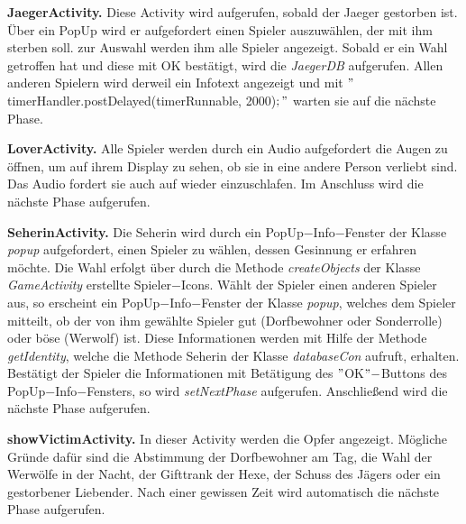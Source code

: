 \documentclass[12pt, a4paper]{article}
\begin{document}
\vspace{0,3 cm}      
      
\textbf{JaegerActivity.}
Diese Activity wird aufgerufen, sobald der Jaeger gestorben ist. Über ein PopUp wird er aufgefordert einen Spieler auszuwählen, der mit ihm sterben soll. zur Auswahl werden ihm alle Spieler angezeigt. Sobald er ein Wahl getroffen hat und diese mit OK bestätigt, wird die \textit{JaegerDB} aufgerufen.
Allen anderen Spielern wird derweil ein Infotext angezeigt und mit $"$timerHandler.postDelayed(timerRunnable, 2000)$;"$ warten sie auf die nächste Phase.
    
\vspace{0,3 cm}    
      
\textbf{LoverActivity.}
Alle Spieler werden durch ein Audio aufgefordert die Augen zu öffnen, um auf ihrem Display zu sehen, ob sie in eine andere Person verliebt sind. Das Audio fordert sie auch auf wieder einzuschlafen. Im Anschluss wird die nächste Phase aufgerufen.

\vspace{0,3 cm}

\textbf{SeherinActivity.}
Die Seherin wird durch ein PopUp$-$Info$-$Fenster der Klasse \textit{popup} aufgefordert, einen Spieler zu wählen, dessen Gesinnung er erfahren möchte. Die Wahl erfolgt über durch die Methode \textit{createObjects} der Klasse \textit{GameActivity} erstellte Spieler$-$Icons. Wählt der Spieler einen anderen Spieler aus, so erscheint ein PopUp$-$Info$-$Fenster der Klasse \textit{popup}, welches dem Spieler mitteilt, ob der von ihm gewählte Spieler gut (Dorfbewohner oder Sonderrolle) oder böse (Werwolf) ist. Diese Informationen werden mit Hilfe der Methode \textit{getIdentity}, welche die Methode Seherin der Klasse \textit{databaseCon} aufruft, erhalten. Bestätigt der Spieler die Informationen mit Betätigung des $"$OK$"-$Buttons des  PopUp$-$Info$-$Fensters, so wird \textit{setNextPhase} aufgerufen. Anschließend wird die nächste Phase aufgerufen.

\vspace{0,3 cm}      
   
\textbf{showVictimActivity.}
In dieser Activity werden die Opfer angezeigt.
Mögliche Gründe dafür sind die Abstimmung der Dorfbewohner am Tag, die Wahl der Werwölfe in der
Nacht, der Gifttrank der Hexe, der Schuss des Jägers oder ein gestorbener Liebender.
Nach einer gewissen Zeit wird automatisch die nächste Phase aufgerufen.

\vspace{0,3 cm}      
      
\end{document}
